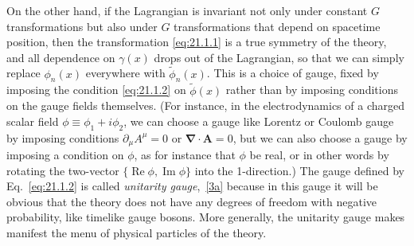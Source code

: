 On the other hand, if the Lagrangian is invariant not only under constant
$G$ transformations but also under $G$ transformations that depend on
spacetime position, then the transformation \eqref{eq:21.1.1} is a true
symmetry of the theory, and all dependence on $\gamma(x)$ drops out of the
Lagrangian, so that we can simply replace $\phi_n(x)$ everywhere with
$\widetilde{\phi}_n(x)$. This is a choice of gauge, fixed by imposing the
condition \eqref{eq:21.1.2} on $\widetilde{\phi}(x)$ rather than by imposing
conditions on the gauge fields themselves. (For instance, in the
electrodynamics of a charged scalar field $\phi\equiv\phi_1+i\phi_2$, we
can choose a gauge like Lorentz or Coulomb gauge by imposing conditions
$\partial_\mu A^\mu=0$ or $\boldsymbol{\nabla}\cdot\mathbf A=0$, but we can
also choose a gauge by imposing a condition on $\phi$, as for instance that
$\phi$ be real, or in other words by rotating the two-vector
$\{\operatorname{Re}\phi,\operatorname{Im}\phi\}$ into the 1-direction.)
The gauge defined by Eq.~\eqref{eq:21.1.2} is called \emph{unitarity
gauge},~\hyperref[ch21-ref-3a]{[3a]} because in this gauge it will be
obvious that the theory does not have any degrees of freedom with negative
probability, like timelike gauge bosons. More generally, the unitarity gauge
makes manifest the menu of physical particles of the theory.


